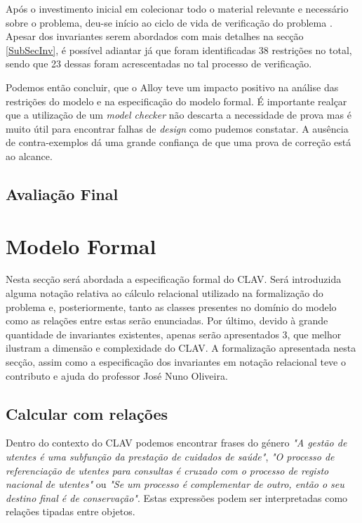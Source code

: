 \documentclass[tikz,runningheads,a4paper]{llncs}
\begin{document}
Após o investimento inicial em colecionar todo o material relevante e necessário sobre o problema, deu-se início ao ciclo de vida de verificação do problema \cite{jno}. Apesar dos invariantes serem abordados com mais detalhes na secção \ref{SubSecInv}, é possível adiantar já que foram identificadas 38 restrições no total, sendo que 23 dessas foram acrescentadas no tal processo de verificação.

Podemos então concluir, que o Alloy teve um impacto positivo na análise das restrições do modelo e na especificação do modelo formal. É importante realçar que a utilização de um \textit{model checker} não descarta a necessidade de prova mas é muito útil para encontrar falhas de \textit{design} como pudemos constatar. A ausência de contra-exemplos dá uma grande confiança de que uma prova de correção está ao alcance.

\subsection{Avaliação Final}

\section{Modelo Formal} \label{SecModel}

Nesta secção será abordada a especificação formal do CLAV. Será introduzida alguma notação relativa ao cálculo relacional utilizado na formalização do problema e, posteriormente, tanto as classes presentes no domínio do modelo como as relações entre estas serão enunciadas. Por último, devido à grande quantidade de invariantes existentes, apenas serão apresentados 3, que melhor ilustram a dimensão e complexidade do CLAV. A formalização apresentada nesta secção, assim como a especificação dos invariantes em notação relacional teve o contributo e ajuda do professor José Nuno Oliveira.

\subsection{Calcular com relações\cite{jno}\cite{jno-5}}

Dentro do contexto do CLAV podemos encontrar frases do género \textit{"A gestão de utentes é uma subfunção da prestação de cuidados de saúde"}, \textit{"O processo de referenciação de utentes para consultas é cruzado com o processo de registo nacional de utentes"} ou \textit{"Se um processo é complementar de outro, então o seu destino final é de conservação"}. Estas expressões podem ser interpretadas como relações tipadas entre objetos.
\end{document}
